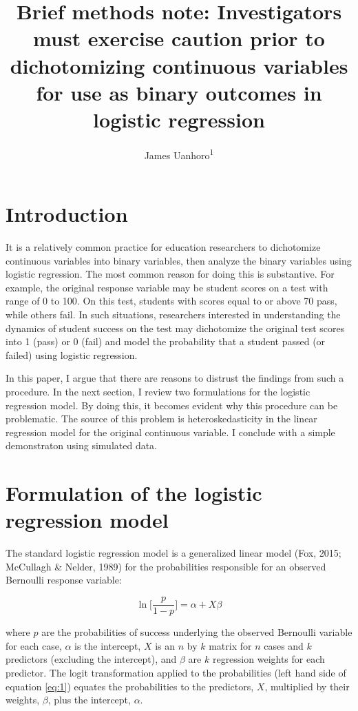 \documentclass[
  english,
  doc]{apa6}
\title{Brief methods note: Investigators must exercise caution prior to dichotomizing continuous variables for use as binary outcomes in logistic regression}
\author{James Uanhoro\textsuperscript{1}}
\date{}
\affiliation{\vspace{0.5cm}\textsuperscript{1} The Ohio State University}
\begin{document}
\maketitle

\hypertarget{introduction}{%
\section{Introduction}\label{introduction}}

It is a relatively common practice for education researchers to dichotomize continuous variables into binary variables, then analyze the binary variables using logistic regression. The most common reason for doing this is substantive. For example, the original response variable may be student scores on a test with range of 0 to 100. On this test, students with scores equal to or above 70 pass, while others fail. In such situations, researchers interested in understanding the dynamics of student success on the test may dichotomize the original test scores into 1 (pass) or 0 (fail) and model the probability that a student passed (or failed) using logistic regression.

In this paper, I argue that there are reasons to distrust the findings from such a procedure. In the next section, I review two formulations for the logistic regression model. By doing this, it becomes evident why this procedure can be problematic. The source of this problem is heteroskedasticity in the linear regression model for the original continuous variable. I conclude with a simple demonstraton using simulated data.

\hypertarget{formulation-of-the-logistic-regression-model}{%
\section{Formulation of the logistic regression model}\label{formulation-of-the-logistic-regression-model}}

The standard logistic regression model is a generalized linear model (Fox, 2015; McCullagh \& Nelder, 1989) for the probabilities responsible for an observed Bernoulli response variable:

\begin{equation} \label{eq:1}
\ln\Bigg[\frac{p}{1-p}\Bigg]=\alpha + X\beta
\end{equation}

where \(p\) are the probabilities of success underlying the observed Bernoulli variable for each case, \(\alpha\) is the intercept, \(X\) is an \(n\) by \(k\) matrix for \(n\) cases and \(k\) predictors (excluding the intercept), and \(\beta\) are \(k\) regression weights for each predictor. The logit transformation applied to the probabilities (left hand side of equation \eqref{eq:1}) equates the probabilities to the predictors, \(X\), multiplied by their weights, \(\beta\), plus the intercept, \(\alpha\).
\end{document}
